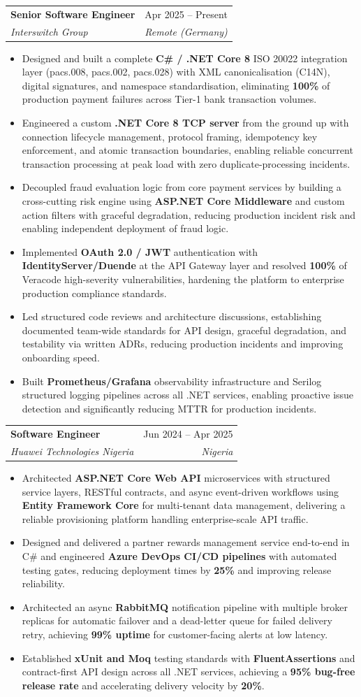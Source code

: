\documentclass[letterpaper,10pt]{article}
\makeatletter
\newcommand{\resumeItem}[1]{
  \item\small{#1 \vspace{-2pt}}
}
\newcommand{\resumeSubheading}[4]{
  \vspace{-2pt}\item
    \begin{tabular*}{0.99\textwidth}[t]{l@{\extracolsep{\fill}}r}
      \textbf{#1} & #2 \\
      \textit{\small#3} & \textit{\small #4} \\
    \end{tabular*}\vspace{-7pt}
}
\newcommand{\resumeItemListStart}{\begin{itemize}[leftmargin=0.18in]}
\newcommand{\resumeItemListEnd}{\end{itemize}\vspace{-5pt}}
\makeatother
\begin{document}
  \resumeSubheading
    {Senior Software Engineer}{Apr 2025 -- Present}
    {Interswitch Group}{Remote (Germany)}
  \resumeItemListStart
    \resumeItem{Designed and built a complete \textbf{C\# / .NET Core 8} ISO 20022 integration layer (pacs.008, pacs.002, pacs.028) with XML canonicalisation (C14N), digital signatures, and namespace standardisation, eliminating \textbf{100\%} of production payment failures across Tier-1 bank transaction volumes.}
    \resumeItem{Engineered a custom \textbf{.NET Core 8 TCP server} from the ground up with connection lifecycle management, protocol framing, idempotency key enforcement, and atomic transaction boundaries, enabling reliable concurrent transaction processing at peak load with zero duplicate-processing incidents.}
    \resumeItem{Decoupled fraud evaluation logic from core payment services by building a cross-cutting risk engine using \textbf{ASP.NET Core Middleware} and custom action filters with graceful degradation, reducing production incident risk and enabling independent deployment of fraud logic.}
    \resumeItem{Implemented \textbf{OAuth 2.0 / JWT} authentication with \textbf{IdentityServer/Duende} at the API Gateway layer and resolved \textbf{100\%} of Veracode high-severity vulnerabilities, hardening the platform to enterprise production compliance standards.}
    \resumeItem{Led structured code reviews and architecture discussions, establishing documented team-wide standards for API design, graceful degradation, and testability via written ADRs, reducing production incidents and improving onboarding speed.}
    \resumeItem{Built \textbf{Prometheus/Grafana} observability infrastructure and Serilog structured logging pipelines across all .NET services, enabling proactive issue detection and significantly reducing MTTR for production incidents.}
  \resumeItemListEnd

  \resumeSubheading
    {Software Engineer}{Jun 2024 -- Apr 2025}
    {Huawei Technologies Nigeria}{Nigeria}
  \resumeItemListStart
    \resumeItem{Architected \textbf{ASP.NET Core Web API} microservices with structured service layers, RESTful contracts, and async event-driven workflows using \textbf{Entity Framework Core} for multi-tenant data management, delivering a reliable provisioning platform handling enterprise-scale API traffic.}
    \resumeItem{Designed and delivered a partner rewards management service end-to-end in C\# and engineered \textbf{Azure DevOps CI/CD pipelines} with automated testing gates, reducing deployment times by \textbf{25\%} and improving release reliability.}
    \resumeItem{Architected an async \textbf{RabbitMQ} notification pipeline with multiple broker replicas for automatic failover and a dead-letter queue for failed delivery retry, achieving \textbf{99\% uptime} for customer-facing alerts at low latency.}
    \resumeItem{Established \textbf{xUnit and Moq} testing standards with \textbf{FluentAssertions} and contract-first API design across all .NET services, achieving a \textbf{95\% bug-free release rate} and accelerating delivery velocity by \textbf{20\%}.}
  \resumeItemListEnd
\end{document}
